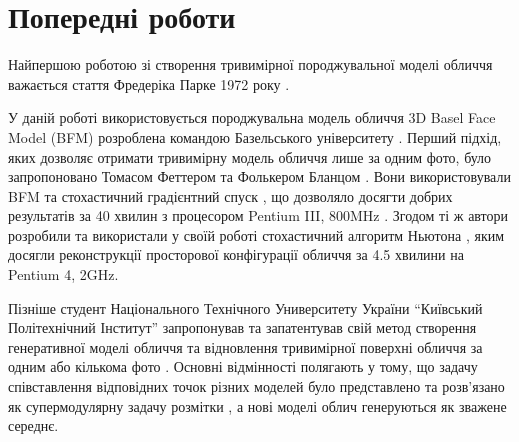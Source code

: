 \section{Попередні роботи}

Найпершою роботою зі створення
тривимірної породжувальної моделі обличчя важається
стаття Фредеріка Парке 1972 року \cite{Parke:1972}.

У даній роботі використовується породжувальна модель обличчя
3D Basel Face Model (BFM)
розроблена командою Базельського університету
\cite{bfm09}.
Перший підхід,
яких дозволяє отримати тривимірну модель обличчя лише за одним фото,
було запропоновано Томасом Феттером та Фолькером Бланцом
\cite{blanz:vetter:1999}.
Вони використовували BFM та стохастичний градієнтний спуск \cite{sgd:1998},
що дозволяло досягти добрих результатів за 40 хвилин з процесором
Pentium III, 800MHz \cite{blanz:romdhani:vetter}.
Згодом ті ж автори розробили та використали у своїй роботі
стохастичний алгоритм Ньютона \cite{blanz:vetter:2003},
яким досягли реконструкції просторової конфігурації обличчя за 4.5 хвилини на
Pentium 4, 2GHz.

Пізніше студент Національного Технічного Университету України
``Київський Політехнічний Інститут'' запропонував та запатентував
свій метод створення генеративної моделі обличчя та відновлення
тривимірної поверхні обличчя за одним або кількома фото \cite{tyshchenko2011}.
Основні відмінності полягають у тому,
що задачу співставлення відповідних точок різних моделей
було представлено та розв'язано як супермодулярну задачу розмітки
\cite{Rossi:2006:HCP:1207782},
а нові моделі облич генеруються як зважене середнє.
